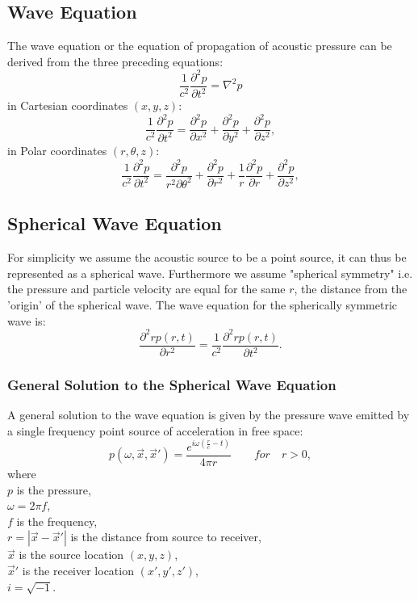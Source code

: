 \subsection{Wave Equation}
The wave equation or the equation of propagation of acoustic pressure can be derived from the three preceding equations:
\begin{equation}
    \frac{1}{c^2}\frac{\partial^2p}{\partial t^2} = \nabla^2p
\end{equation}
in Cartesian coordinates $(x,y,z)$:
\begin{equation}
    \frac{1}{c^2}\frac{\partial^2p}{\partial t^2} = \frac{\partial^2p}{\partial x^2} + \frac{\partial^2p}{\partial y^2} + \frac{\partial^2p}{\partial z^2},
\end{equation}
in Polar coordinates $(r,\theta, z)$:
\begin{equation}
    \frac{1}{c^2}\frac{\partial^2p}{\partial t^2} = \frac{\partial^2p}{r^2\partial \theta^2} + \frac{\partial^2p}{\partial r^2} + \frac{1}{r}\frac{\partial^2p}{\partial r} + \frac{\partial^2p}{\partial z^2},
\end{equation}

\subsection{Spherical Wave Equation}

For simplicity we assume the acoustic source to be a point source, it can thus be represented as a spherical wave. Furthermore we assume "spherical symmetry" i.e. the pressure and particle velocity are equal for the same $r$, the distance from the 'origin' of the spherical wave. The wave equation for the spherically symmetric wave is\cite{Waves2004}:
\begin{equation}
    \frac{\partial^2rp(r,t)}{\partial r^2} = \frac{1}{c^2}\frac{\partial^2rp(r,t)}{\partial t^2}.
\end{equation}
\subsubsection{General Solution to the Spherical Wave Equation}
A general solution to the wave equation is given by the pressure wave emitted by a single frequency point source of acceleration in free space\cite{Allen1979}:
\begin{equation}
    p(\omega,\Vec{x},\Vec{x}') = \frac{e^{i\omega(\frac{r}{c}-t)}}{4\pi r}\quad\quad for\quad r > 0,
\end{equation}
where\\
$p$ is the pressure,\\
$\omega=2\pi f$,\\
$f$ is the frequency,\\
$r=|\Vec{x}-\Vec{x}'|$ is the distance from source to receiver,\\
$\Vec{x}$ is the source location $(x,y,z)$,\\
$\Vec{x}'$ is the receiver location $(x',y',z')$,\\
$i=\sqrt{-1}$.\\



